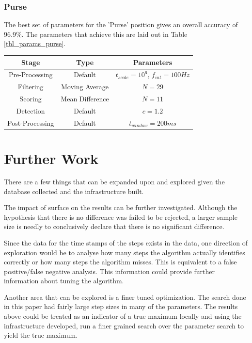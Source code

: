             \subsection{Purse}

                The best set of parameters for the 'Purse' position gives an overall accuracy of 96.9\%. The parameters that achieve this are laid out in Table \ref{tbl_params_purse}.

                \begin{center}
                    \label{tbl_params_purse}
                    \begin{tabular}{|c|c|c|}
                        \hline
                        Stage & Type & Parameters \\
                        \hline
                        Pre-Processing & Default & $t_{scale}=10^6$, $f_{int}=100Hz$ \\
                        Filtering & Moving Average & $N=29$ \\
                        Scoring & Mean Difference & $N=11$ \\
                        Detection & Default & $c=1.2$ \\
                        Post-Processing & Default & $t_{window}=200ms$ \\
                        \hline
                    \end{tabular}
                \end{center}    



    \chapter{Further Work}

        There are a few things that can be expanded upon and explored given the database collected and the infrastructure built. 

        The impact of surface on the results can be further investigated. Although the hypothesis that there is no difference was failed to be rejected, a larger sample size is needly to conclusively declare that there is no significant difference.

        Since the data for the time stamps of the steps exists in the data, one direction of exploration would be to analyse how many steps the algorithm actually identifies correctly or how many steps the algorithm misses. This is equivalent to a false positive/false negative analysis. This information could provide further information about tuning the algorithm. 

        Another area that can be explored is a finer tuned optimization. The search done in this paper had fairly large step sizes in many of the parameters. The results above could be treated as an indicator of a true maximum locally and using the infrastructure developed, run a finer grained search over the parameter search to yield the true maximum.